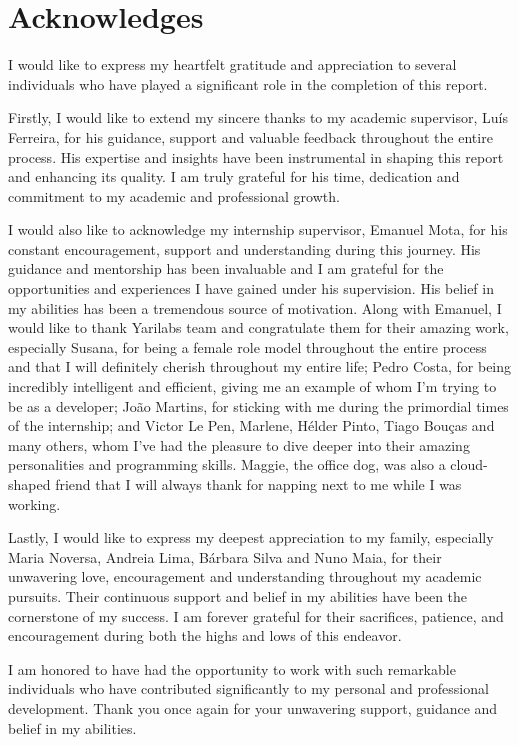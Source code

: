 \chapter*{Acknowledges}

I would like to express my heartfelt gratitude and appreciation to several individuals who have played a significant role in the completion of this report.\newline

Firstly, I would like to extend my sincere thanks to my academic supervisor, Luís Ferreira, for his guidance, support and valuable feedback throughout the entire process. His expertise and insights have been instrumental in shaping this report and enhancing its quality. I am truly grateful for his time, dedication and commitment to my academic and professional growth.\newline

I would also like to acknowledge my internship supervisor, Emanuel Mota, for his constant encouragement, support and understanding during this journey. His guidance and mentorship has been invaluable and I am grateful for the opportunities and experiences I have gained under his supervision. His belief in my abilities has been a tremendous source of motivation. Along with Emanuel, I would like to thank Yarilabs team and congratulate them for their amazing work, especially Susana, for being a female role model throughout the entire process and that I will definitely cherish throughout my entire life; Pedro Costa, for being incredibly intelligent and efficient, giving me an example of whom I'm trying to be as a developer; João Martins, for sticking with me during the primordial times of the internship; and Victor Le Pen, Marlene, Hélder Pinto, Tiago Bouças and many others, whom I've had the pleasure to dive deeper into their amazing personalities and programming skills. Maggie, the office dog, was also a cloud-shaped friend that I will always thank for napping next to me while I was working.\newline

Lastly, I would like to express my deepest appreciation to my family, especially Maria Noversa, Andreia Lima, Bárbara Silva and Nuno Maia, for their unwavering love, encouragement and understanding throughout my academic pursuits. Their continuous support and belief in my abilities have been the cornerstone of my success. I am forever grateful for their sacrifices, patience, and encouragement during both the highs and lows of this endeavor.\newline

I am honored to have had the opportunity to work with such remarkable individuals who have contributed significantly to my personal and professional development. Thank you once again for your unwavering support, guidance and belief in my abilities.

\vspace{10mm}
